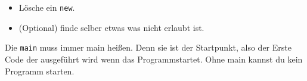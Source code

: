 \begin{enumerate}
\begin{itemize}
              \item Lösche ein \lstinline{new}.
              \item (Optional) finde selber etwas was nicht erlaubt ist.
          \end{itemize}
          \begin{Infobox}[main]
              Die \lstinline{main} muss immer main heißen. Denn sie ist der Startpunkt, also der Erste Code der ausgeführt wird wenn das Programmstartet. Ohne main kannst du kein Programm starten.
          \end{Infobox}
\end{enumerate}

